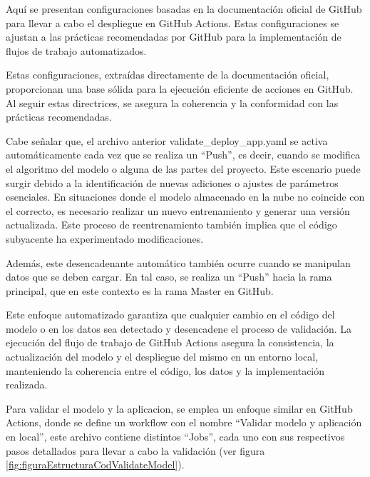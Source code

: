 \newpage

Aquí se presentan configuraciones basadas en la documentación oficial de GitHub para llevar a cabo el despliegue en GitHub Actions. Estas configuraciones se ajustan a las prácticas recomendadas por GitHub para la implementación de flujos de trabajo automatizados. \newline

Estas configuraciones, extraídas directamente de la documentación oficial, proporcionan una base sólida para la ejecución eficiente de acciones en GitHub. Al seguir estas directrices, se asegura la coherencia y la conformidad con las prácticas recomendadas. \newline

Cabe señalar que, el archivo anterior validate\_deploy\_app.yaml se activa automáticamente cada vez que se realiza un ``Push'', es decir, cuando se modifica el algoritmo del modelo o alguna de las partes del proyecto. Este escenario puede surgir debido a la identificación de nuevas adiciones o ajustes de parámetros esenciales. En situaciones donde el modelo almacenado en la nube no coincide con el correcto, es necesario realizar un nuevo entrenamiento y generar una versión actualizada. Este proceso de reentrenamiento también implica que el código subyacente ha experimentado modificaciones. \newline

Además, este desencadenante automático también ocurre cuando se manipulan datos que se deben cargar. En tal caso, se realiza un ``Push'' hacia la rama principal, que en este contexto es la rama Master en GitHub. \newline

Este enfoque automatizado garantiza que cualquier cambio en el código del modelo o en los datos sea detectado y desencadene el proceso de validación. La ejecución del flujo de trabajo de GitHub Actions asegura la consistencia, la actualización del modelo y el despliegue del mismo en un entorno local, manteniendo la coherencia entre el código, los datos y la implementación realizada. \newline

Para validar el modelo y la aplicacion, se emplea un enfoque similar en GitHub Actions, donde se define un workflow con el nombre ``Validar modelo y aplicación en local'', este archivo contiene distintos ``Jobs'', cada uno con sus respectivos pasos detallados para llevar a cabo la validación (ver figura \ref{fig:figuraEstructuraCodValidateModel}). 

